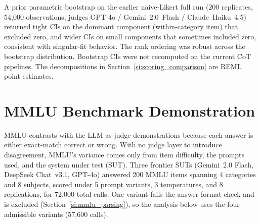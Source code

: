 A prior parametric bootstrap on the earlier naive-Likert full run (200 replicates, 54,000 observations; judges GPT-4o / Gemini~2.0~Flash / Claude~Haiku~4.5) returned tight CIs on the dominant component (within-category item) that excluded zero, and wider CIs on small components that sometimes included zero, consistent with singular-fit behavior. The rank ordering was robust across the bootstrap distribution. Bootstrap CIs were not recomputed on the current CoT pipelines. The decompositions in Section~\ref{si:scoring_comparison} are REML point estimates.






\clearpage

\section{MMLU Benchmark Demonstration}
\label{si:mmlu}

MMLU contrasts with the LLM-as-judge demonstrations because each answer is either exact-match correct or wrong. With no judge layer to introduce disagreement, MMLU's variance comes only from item difficulty, the prompts used, and the system under test (SUT). Three frontier SUTs (Gemini~2.0 Flash, DeepSeek Chat~v3.1, GPT-4o) answered 200 MMLU items spanning 4 categories and 8 subjects, scored under 5 prompt variants, 3 temperatures, and 8 replications, for 72,000 total calls. One variant fails the answer-format check and is excluded (Section~\ref{si:mmlu_parsing}), so the analysis below uses the four admissible variants (57,600 calls).

